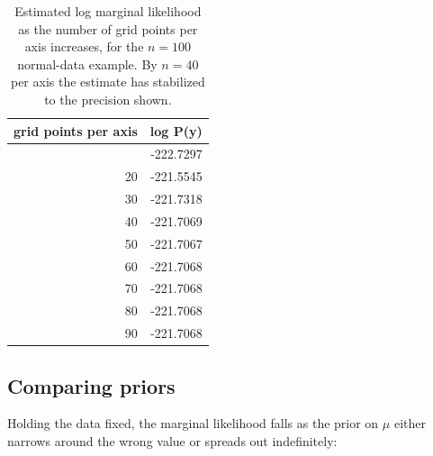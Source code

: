 \documentclass[
  letterpaper,
  DIV=11,
  numbers=noendperiod]{scrreprt}
\begin{document}
{

\begin{longtable}[]{@{}rr@{}}

\caption{\label{tbl-quad-convergence}Estimated log marginal likelihood
as the number of grid points per axis increases, for the \(n=100\)
normal-data example. By \(n=40\) per axis the estimate has stabilized to
the precision shown.}

\tabularnewline

\toprule\noalign{}
grid points per axis & log P(y) \\
\midrule\noalign{}
\endhead
\bottomrule\noalign{}
\endlastfoot
10 & -222.7297 \\
20 & -221.5545 \\
30 & -221.7318 \\
40 & -221.7069 \\
50 & -221.7067 \\
60 & -221.7068 \\
70 & -221.7068 \\
80 & -221.7068 \\
90 & -221.7068 \\

\end{longtable}

}

\subsection{Comparing priors}\label{comparing-priors}

Holding the data fixed, the marginal likelihood falls as the prior on
\(\mu\) either narrows around the wrong value or spreads out
indefinitely:
\end{document}
